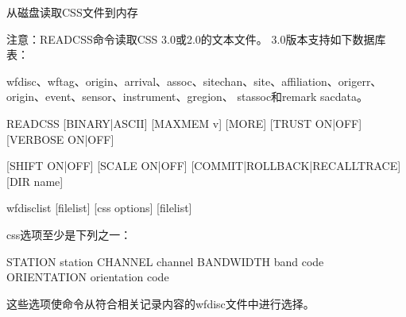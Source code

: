 \label{cmd:readcss}

从磁盘读取CSS文件到内存

注意：READCSS命令读取CSS 3.0或2.0的文本文件。
3.0版本支持如下数据库表：

wfdisc、wftag、origin、arrival、assoc、sitechan、site、affiliation、origerr、origin、event、sensor、instrument、gregion、
stassoc和remark sacdata。

\begin{SACSTX}
READCSS [BINARY|ASCII] [MAXMEM v] [MORE] [TRUST ON|OFF] [VERBOSE ON|OFF] 

[SHIFT ON|OFF] [SCALE ON|OFF] [COMMIT|ROLLBACK|RECALLTRACE] [DIR name] 

wfdisclist [filelist] [css options] [filelist]
\end{SACSTX}

css选项至少是下列之一：

\begin{SACSTX}
STATION station
CHANNEL channel
BANDWIDTH band code
ORIENTATION orientation code
\end{SACSTX}

这些选项使命令从符合相关记录内容的wfdisc文件中进行选择。

